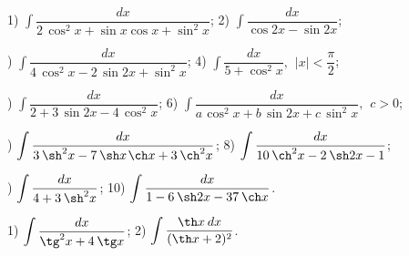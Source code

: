 \documentclass{article}
\begin{document}
\par{} 1) $ \displaystyle \int \dfrac{dx}{2\hspace{2pt}{\cos^2x}+{\sin x}{\cos x}+{\sin^2x}} $; \hspace{10pt}
2) $ \displaystyle \int \dfrac{dx}{{\cos 2x}-{\sin 2x}} $;

\par{}) $ \displaystyle \int \dfrac{dx}{4\hspace{2pt}{\cos^2x}-2\hspace{2pt}{\sin 2x}+{\sin^2x}} $; \hspace{10pt}
4) $ \displaystyle \int \dfrac{dx}{5+{\cos^2x}}, \hspace{5pt} |x| < \dfrac{\pi}{2} $;

\par{}) $ \displaystyle \int \dfrac{dx}{2+3\hspace{2pt}{\sin 2x}-4\hspace{2pt}{\cos^2x}} $; \hspace{10pt}
6) $ \displaystyle \int \dfrac{dx}{a\hspace{1pt}{\cos^2x}+b\hspace{2pt}{\sin 2x}+c\hspace{2pt}{\sin^2x}}, \hspace{5pt}c>0 $;

\par{}) $ \displaystyle \int \dfrac{dx}{3\hspace{2pt}{\sh^2x}-7\hspace{2pt}{\sh x}\hspace{1pt}{\ch x} +3\hspace{2pt}{\ch^2x}}$; \hspace{10pt}
8) $ \displaystyle \int \dfrac{dx}{10\hspace{2pt}{\ch^2x}-2\hspace{2pt}{\sh 2x}-1} $;

\par{}) $ \displaystyle \int \dfrac{dx}{4+3\hspace{2pt}{\sh^2x}} $; \hspace{10pt}
10) $ \displaystyle \int \dfrac{dx}{1-6\hspace{2pt}{\sh 2x}-37\hspace{2pt}{\ch x}} $.

\par{} 1) $ \displaystyle \int \dfrac{dx}{{\tg^2x}+4\hspace{2pt}{\tg x}} $; \hspace{10pt}
2) $ \displaystyle \int \dfrac{{\th x}\hspace{2pt}dx}{({\th x}+2)^2} $.
\end{document}

